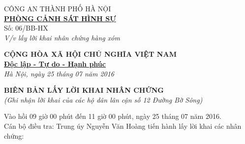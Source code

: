 \documentclass[12pt,a4paper]{article}
\begin{document}
\noindent
\begin{minipage}[t]{0.45\textwidth}
    \begin{center}
        \small
        CÔNG AN THÀNH PHỐ HÀ NỘI\\
        \textbf{\underline{PHÒNG CẢNH SÁT HÌNH SỰ}}\\[0.1cm]
        Số: 06/BB-HX\\
        \textit{V/v lấy lời khai nhân chứng hàng xóm}
    \end{center}
\end{minipage}
\hfill
\begin{minipage}[t]{0.52\textwidth}
    \begin{center}
        \small
        \textbf{CỘNG HÒA XÃ HỘI CHỦ NGHĨA VIỆT NAM}\\
        \textbf{\underline{Độc lập - Tự do - Hạnh phúc}}\\[0.1cm]
        \textit{Hà Nội, ngày 25 tháng 07 năm 2016}
    \end{center}
\end{minipage}

\vspace{0.6cm}

\begin{center}
    \textbf{\large BIÊN BẢN LẤY LỜI KHAI NHÂN CHỨNG}\\
    \textit{(Ghi nhận lời khai của các hộ dân lân cận số 12 Đường Bờ Sông)}
\end{center}

\vspace{0.3cm}

\noindent Vào hồi 09 giờ 00 phút đến 11 giờ 00 phút, ngày 25 tháng 07 năm 2016.\\
Cán bộ điều tra: Trung úy Nguyễn Văn Hoàng tiến hành lấy lời khai các nhân chứng:
\end{document}
